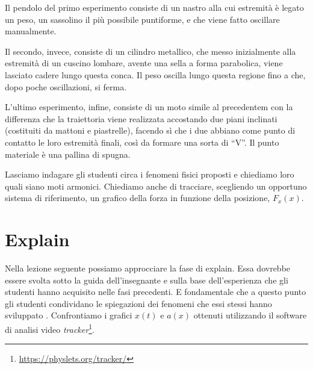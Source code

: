 \documentclass{article}
\begin{document}
Il pendolo del primo esperimento consiste di un nastro alla cui estremità è legato un peso, un
sassolino il più possibile puntiforme, e che viene fatto oscillare manualmente.

Il secondo, invece, consiste di un cilindro metallico, che messo inizialmente alla estremità di un cuscino
lombare, avente una sella a forma parabolica, viene lasciato cadere lungo questa conca. Il peso oscilla
lungo questa regione fino a che, dopo poche oscillazioni, si ferma.

L'ultimo esperimento, infine, consiste di un moto simile al precedentem con la differenza che la traiettoria
viene realizzata accostando due piani inclinati (costituiti da mattoni e piastrelle), facendo sì che i due
abbiano come punto di contatto le loro estremità finali, così da formare una sorta di “V”. Il punto
materiale è una pallina di spugna.

Lasciamo indagare gli studenti circa i fenomeni fisici proposti e chiediamo loro quali siano
moti armonici. Chiediamo anche di tracciare, scegliendo un opportuno sistema di riferimento, un grafico della forza in
funzione della posizione, $F_x(x)$\cite{barbieri2015good}.

\section{Explain}
Nella lezione seguente possiamo approcciare la fase di explain.
Essa dovrebbe essere svolta sotto la guida dell'insegnante e 
sulla base dell'esperienza che gli studenti hanno acquisito nelle
fasi precedenti. E fondamentale che a questo punto gli studenti
condividano le spiegazioni dei fenomeni che essi stessi
hanno sviluppato \cite{duran20045e}.
Confrontiamo i grafici $x(t)$ e $a(x)$ ottenuti utilizzando il software di
analisi video \emph{tracker}\footnote{\url{https://physlets.org/tracker/}}.
\end{document}
